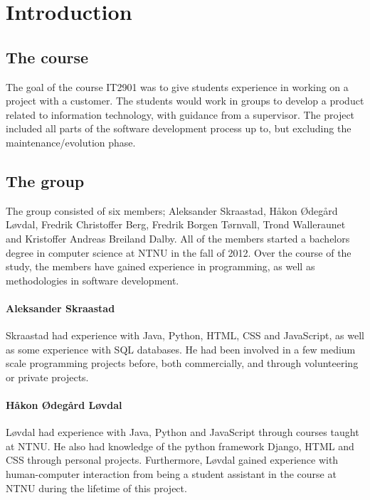 
\chapter{Introduction}
\label{ch:introduction}

\section{The course}
\label{sec:introduction-the_course}

The goal of the course IT2901 was to give students experience in working on a project with a customer. The students would work in groups to develop a product related to information technology, with guidance from a supervisor. The project included all parts of the software development process up to, but excluding the maintenance/evolution phase.

\section{The group}
\label{sec:introduction-the_group}

The group consisted of six members; Aleksander Skraastad, Håkon Ødegård Løvdal, Fredrik Christoffer Berg, Fredrik Borgen Tørnvall, Trond Walleraunet and Kristoffer Andreas Breiland Dalby. All of the members started a bachelors degree in computer science at NTNU in the fall of 2012. Over the course of the study, the members have gained experience in programming, as well as methodologies in software development.

\subsubsection{Aleksander Skraastad}
Skraastad had experience with Java, Python, HTML, CSS and JavaScript, as well as some experience with SQL databases. He had been involved in a few medium scale programming projects before, both commercially, and through volunteering or private projects.

\subsubsection{Håkon Ødegård Løvdal}

Løvdal had experience with Java, Python and JavaScript through courses taught at NTNU. He also had knowledge of the python framework Django, HTML and CSS through personal projects. Furthermore, Løvdal gained experience with human-computer interaction from being a student assistant in the course at NTNU during the lifetime of this project. 

